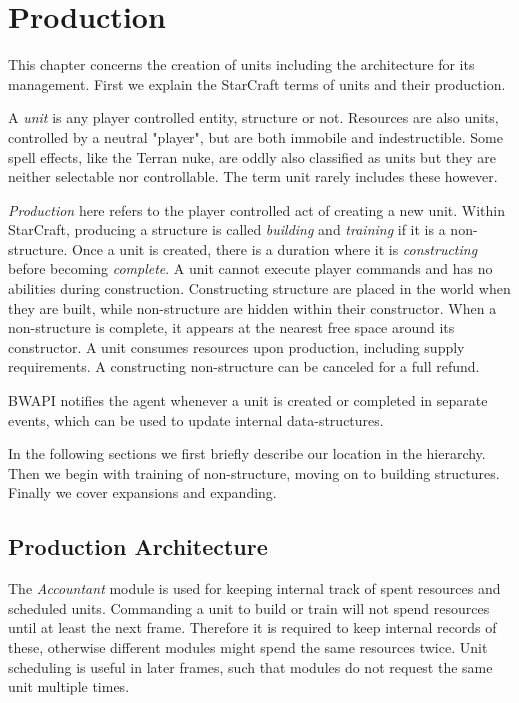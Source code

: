 \chapter{Production}
\label{ch:production}
This chapter concerns the creation of units including the architecture for its management. First we explain the StarCraft terms of units and their production.

A \emph{unit} is any player controlled entity, structure or not. Resources are also units, controlled by a neutral "player", but are both immobile and indestructible. Some spell effects, like the Terran nuke, are oddly also classified as units but they are neither selectable nor controllable. The term unit rarely includes these however.

\emph{Production} here refers to the player controlled act of creating a new unit. Within StarCraft, producing a structure is called \emph{building} and \emph{training} if it is a non-structure. Once a unit is created, there is a duration where it is \emph{constructing} before becoming \emph{complete}. A unit cannot execute player commands and has no abilities during construction. Constructing structure are placed in the world when they are built, while non-structure are hidden within their constructor. When a non-structure is complete, it appears at the nearest free space around its constructor. A unit consumes resources upon production, including supply requirements. A constructing non-structure can be canceled for a full refund.

BWAPI notifies the agent whenever a unit is created or completed in separate events, which can be used to update internal data-structures.

In the following sections we first briefly describe our location in the hierarchy. Then we begin with training of non-structure, moving on to building structures. Finally we cover expansions and expanding.

\section{Production Architecture}
The \emph{Accountant} module is used for keeping internal track of spent resources and scheduled units. Commanding a unit to build or train will not spend resources until at least the next frame. Therefore it is required to keep internal records of these, otherwise different modules might spend the same resources twice. Unit scheduling is useful in later frames, such that modules do not request the same unit multiple times.

